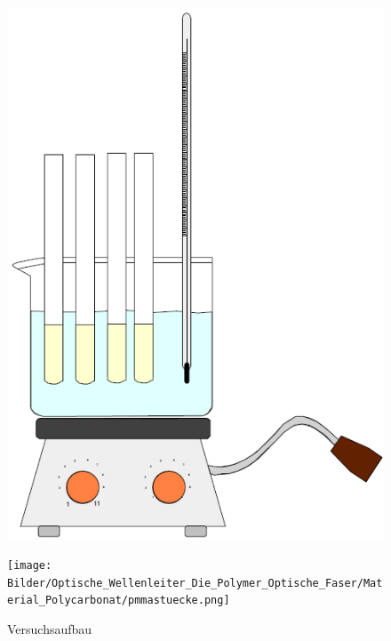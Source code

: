 \begin{figure}[h]
    \begin{center}
        \begin{minipage}[t]{0.3\textwidth}
            \begin{center}
                \includegraphics[height=0.1\textheight]{Bilder/Optische_Wellenleiter_Die_Polymer_Optische_Faser/Material_Polycarbonat/mmawasserbad.png}
                \caption[Versuchsaufbau]{Versuchsaufbau}
                \label{fig:mmawasserbad}
            \end{center}
        \end{minipage}
        \hspace{0.025\textwidth}
        \begin{minipage}[t]{0.3\textwidth}
            \begin{center}
                \texttt{[image: Bilder/Optische\_Wellenleiter\_Die\_Polymer\_Optische\_Faser/Material\_Polycarbonat/pmmastuecke.png]}

\end{center}
\end{minipage}
\end{center}
\end{figure}
